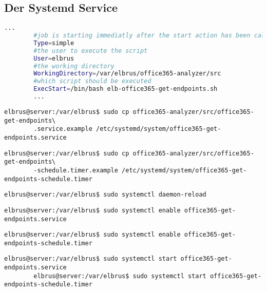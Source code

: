	\subsection[systemd service]{Der Systemd Service}
	
	\lstset{style=files}
	\begin{lstlisting}[caption={uptime\_monitor.service.example - Die Variable 'WorkingDirectory' sowie die Variable 'User' anpassen.},language=bash ,keywords={WorkingDirectory, User}, keywordstyle=\color{red}, firstnumber=4]
		...
		#job is starting immediatly after the start action has been called
		Type=simple
		#the user to execute the script
		User=elbrus
		#the working directory
		WorkingDirectory=/var/elbrus/office365-analyzer/src
		#which script should be executed
		ExecStart=/bin/bash elb-office365-get-endpoints.sh
		...
	\end{lstlisting}
	
	\lstset{style=commands}
	\begin{lstlisting}[caption={Kopieren des Serviceprogrammes.}]
		elbrus@server:/var/elbrus$ sudo cp office365-analyzer/src/office365-get-endpoints\
		.service.example /etc/systemd/system/office365-get-endpoints.service
	\end{lstlisting}
	
	\lstset{style=commands}
	\begin{lstlisting}[caption={Kopieren des Zeitplanungsprogrammes.}]
		elbrus@server:/var/elbrus$ sudo cp office365-analyzer/src/office365-get-endpoints\
		-schedule.timer.example /etc/systemd/system/office365-get-endpoints-schedule.timer
	\end{lstlisting}
	
	\lstset{style=commands}
	\begin{lstlisting}[caption={Neuladen des 'systemctl' Deamons.}]
		elbrus@server:/var/elbrus$ sudo systemctl daemon-reload
	\end{lstlisting}
	
	\lstset{style=commands}
	\begin{lstlisting}[caption={Aktivieren des Serviceprogrammes.}]
		elbrus@server:/var/elbrus$ sudo systemctl enable office365-get-endpoints.service
	\end{lstlisting}
	
	\lstset{style=commands}
	\begin{lstlisting}[caption={Aktivieren des Zeitplanungsprogrammes.}]
		elbrus@server:/var/elbrus$ sudo systemctl enable office365-get-endpoints-schedule.timer
	\end{lstlisting}
	
	\lstset{style=commands}
	\begin{lstlisting}[caption={Starten des Serviceprogrammes \& Zeitplanungsprogrammes.}]
		elbrus@server:/var/elbrus$ sudo systemctl start office365-get-endpoints.service
		elbrus@server:/var/elbrus$ sudo systemctl start office365-get-endpoints-schedule.timer
	\end{lstlisting}